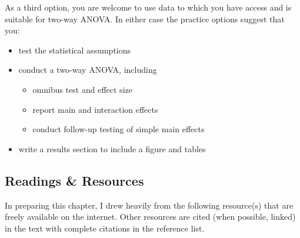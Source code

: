 \documentclass[
  11pt,
]{book}
\providecommand{\tightlist}{%
  \setlength{\itemsep}{0pt}\setlength{\parskip}{0pt}}
\begin{document}
As a third option, you are welcome to use data to which you have access and is suitable for two-way ANOVA. In either case the practice options suggest that you:

\begin{itemize}
\tightlist
\item
  test the statistical assumptions
\item
  conduct a two-way ANOVA, including

  \begin{itemize}
  \tightlist
  \item
    omnibus test and effect size
  \item
    report main and interaction effects
  \item
    conduct follow-up testing of simple main effects
  \end{itemize}
\item
  write a results section to include a figure and tables
\end{itemize}

\hypertarget{readings-resources-5}{%
\subsection{Readings \& Resources}\label{readings-resources-5}}

In preparing this chapter, I drew heavily from the following resource(s) that are freely available on the internet. Other resources are cited (when possible, linked) in the text with complete citations in the reference list.
\end{document}
